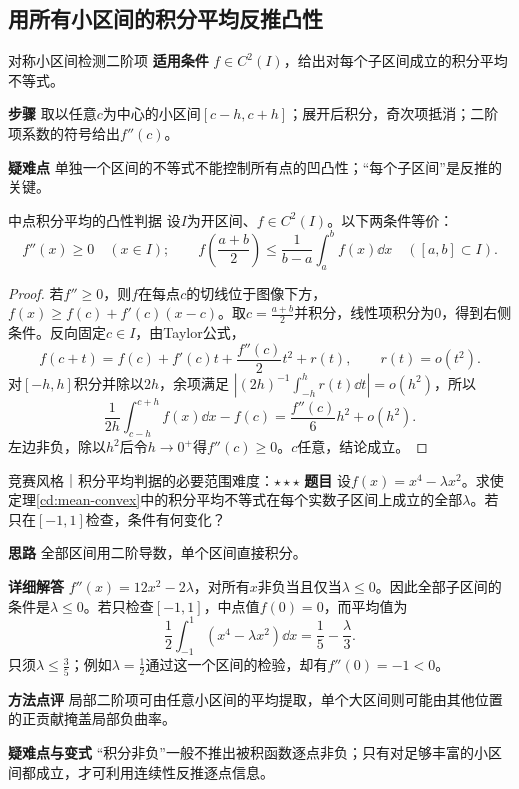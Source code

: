 \subsection{用所有小区间的积分平均反推凸性}
\begin{method}{对称小区间检测二阶项}
\textbf{适用条件} $f\in C^2(I)$，给出对每个子区间成立的积分平均不等式。\par
\textbf{步骤} 取以任意$c$为中心的小区间$[c-h,c+h]$；展开后积分，奇次项抵消；二阶项系数的符号给出$f''(c)$。\par
\textbf{疑难点} 单独一个区间的不等式不能控制所有点的凹凸性；“每个子区间”是反推的关键。
\end{method}
\begin{theorem}{中点积分平均的凸性判据}\label{cd:mean-convex}
设$I$为开区间、$f\in C^2(I)$。以下两条件等价：
\[
 f''(x)\ge0\quad(x\in I);
 \qquad
 f\!\left(\dfrac{a+b}{2}\right)
 \le\dfrac1{b-a}\int_a^bf(x)\dd x
 \quad([a,b]\subset I).
\]
\end{theorem}
\begin{proof}
若$f''\ge0$，则$f$在每点$c$的切线位于图像下方，
$f(x)\ge f(c)+f'(c)(x-c)$。取$c=\frac{a+b}{2}$并积分，线性项积分为0，得到右侧条件。反向固定$c\in I$，由Taylor公式，
\[
 f(c+t)=f(c)+f'(c)t+\dfrac{f''(c)}2t^2+r(t),
 \qquad r(t)=o(t^2).
\]
对$[-h,h]$积分并除以$2h$，余项满足
$\left|(2h)^{-1}\int_{-h}^hr(t)\dd t\right|=o(h^2)$，所以
\[
 \dfrac1{2h}\int_{c-h}^{c+h}f(x)\dd x-f(c)
 =\dfrac{f''(c)}6h^2+o(h^2).
\]
左边非负，除以$h^2$后令$h\to0^+$得$f''(c)\ge0$。$c$任意，结论成立。
\end{proof}
\begin{example}{竞赛风格｜积分平均判据的必要范围}{难度：$\star\star\star$}\label{cd:ex:mean-convex}
\textbf{题目} 设$f(x)=x^4-\lambda x^2$。求使定理\ref{cd:mean-convex}中的积分平均不等式在每个实数子区间上成立的全部$\lambda$。若只在$[-1,1]$检查，条件有何变化？\par
\textbf{思路} 全部区间用二阶导数，单个区间直接积分。\par
\textbf{详细解答} $f''(x)=12x^2-2\lambda$，对所有$x$非负当且仅当$\lambda\le0$。因此全部子区间的条件是$\lambda\le0$。若只检查$[-1,1]$，中点值$f(0)=0$，而平均值为
\[
 \dfrac12\int_{-1}^1(x^4-\lambda x^2)\dd x
 =\dfrac15-\dfrac{\lambda}{3}.
\]
只须$\lambda\le\frac{3}{5}$；例如$\lambda=\frac{1}{2}$通过这一个区间的检验，却有$f''(0)=-1<0$。\par
\textbf{方法点评} 局部二阶项可由任意小区间的平均提取，单个大区间则可能由其他位置的正贡献掩盖局部负曲率。\par
\textbf{疑难点与变式} “积分非负”一般不推出被积函数逐点非负；只有对足够丰富的小区间都成立，才可利用连续性反推逐点信息。
\end{example}

